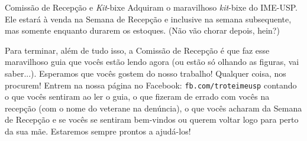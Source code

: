 \begin{secao}{Comissão de Recepção e \textit{Kit}-bixe}
Adquiram o maravilhoso \textit{kit}-bixe do IME-USP. Ele estará à venda na Semana de Recepção
e inclusive na semana subsequente, mas somente enquanto durarem os estoques. (Não vão chorar
depois, hein?)

Para terminar, além de tudo isso, a Comissão de Recepção é que faz esse maravilhoso guia que
vocês estão lendo agora (ou estão só olhando as figuras, vai
saber...). Esperamos que vocês gostem do nosso trabalho! Qualquer coisa, nos
procurem! Entrem na nossa página no Facebook: {\tt fb.com/troteimeusp} contando
o que vocês sentiram ao ler o guia, o que fizeram de errado com vocês na
recepção (com o nome do veterane na denúncia), o que vocês acharam da Semana
de Recepção e se vocês se sentiram bem-vindos ou querem voltar logo para perto
da sua mãe. Estaremos sempre prontos a ajudá-los!
\end{secao}
